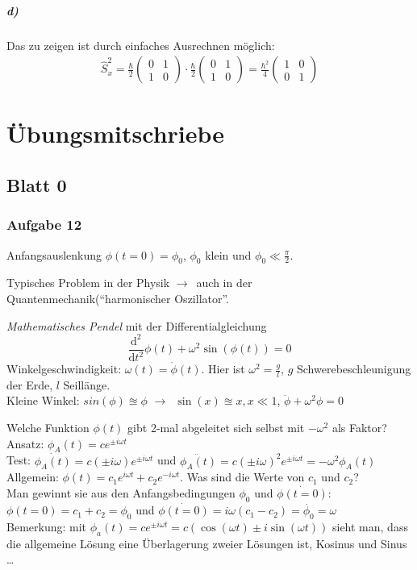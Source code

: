 \documentclass[oneside]{book}
\theoremstyle{definition}
\newcommand{\conseq}{$\rightarrow$~}
\newcommand{\QM}{Quantenmechanik}
\newcommand{\Dgl}{Differentialgleichung}
\renewcommand{\d}{\mathrm d}
\begin{document}
\paragraph{d)}
Das zu zeigen ist durch einfaches Ausrechnen möglich:
\begin{align*}
	\hat{S}_x^2 = \frac{\hbar}{2} \begin{pmatrix}
	0 & 1\\ 1 & 0
	\end{pmatrix} \cdot \frac{\hbar}{2} \begin{pmatrix}
	0 & 1\\ 1 & 0
	\end{pmatrix} = \frac{\hbar^2}{4} \begin{pmatrix}
	1 & 0\\ 0 & 1
	\end{pmatrix} 
\end{align*}

\chapter{Übungsmitschriebe}

\section{Blatt 0}
\subsection{Aufgabe 12}
Anfangsauslenkung $\phi(t = 0) = \phi_0$, $\phi_0$ klein und $\phi_0 \ll \frac{\pi}{2}$.

Typisches Problem in der Physik \conseq auch in der \QM ("`harmonischer Oszillator"'.
 
\textit{Mathematisches Pendel} mit der \Dgl
$$ \frac{\d^2}{\d t^2} \phi(t) + \omega^2 \sin(\phi(t)) = 0$$
Winkelgeschwindigkeit: $\omega(t) = \dot\phi(t)$. Hier ist $\omega^2 = \frac{g}{l}$, $g$ Schwerebeschleunigung der Erde, $l$ Seillänge.\\
Kleine Winkel: $sin(\phi) \approxeq \phi$ \conseq $\sin(x) \approxeq x, x \ll 1$, $\ddot{\phi} + \omega^2 \phi = 0$

Welche Funktion $\phi(t)$ gibt 2-mal abgeleitet sich selbst mit $-\omega^2$ als Faktor?\\
Ansatz: $\phi_A(t) = c e^{\pm i \omega t}$\\
Test: $\dot{\phi_A(t)} = c (\pm i \omega) e^{\pm i \omega t}$ und $\ddot{\phi_A(t)} = c (\pm i \omega)^2 e^{\pm i \omega t} = - \omega^2 \phi_A(t)$\\
Allgemein: $\phi(t) = c_1 e^{i \omega t} + c_2 e^{- i \omega t}$. Was sind die Werte von $c_1$ und $c_2$?\\
Man gewinnt sie aus den Anfangsbedingungen $\phi_0$ und $\dot{\phi(t = 0)}$: $\phi(t = 0) = c_1 + c_2 = \phi_0$ und $\dot{\phi(t = 0)} = i \omega (c_1 - c_2) = \dot{\phi_0} = \omega$\\
Bemerkung: mit $\phi_a(t) = c e^{\pm i \omega t} = c (\cos(\omega t) \pm i \sin(\omega t))$ sieht man, dass die allgemeine Lösung eine Überlagerung zweier Lösungen ist, Kosinus und Sinus \dots
\end{document}
